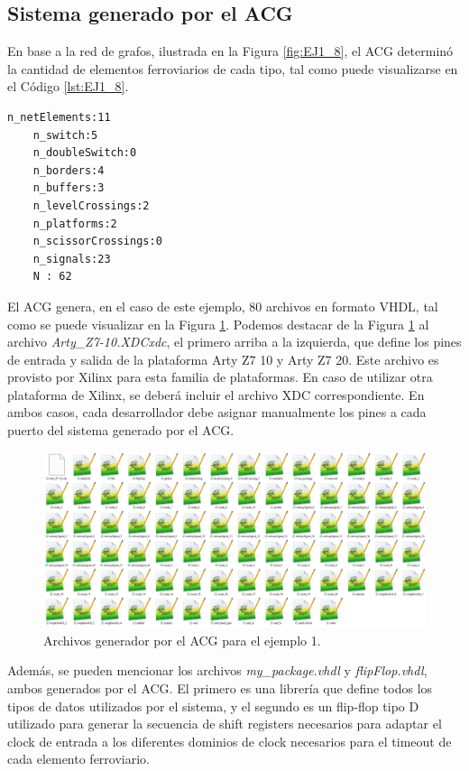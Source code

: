 \subsection{Sistema generado por el ACG}
	\label{sec:EJEMPLO1_ACG}
	
	En base a la red de grafos, ilustrada en la Figura \ref{fig:EJ1_8}, el ACG determinó la cantidad de elementos ferroviarios de cada tipo, tal como puede visualizarse en el Código \ref{lst:EJ1_8}.
	
	\begin{lstlisting}[language = {}, caption = Cantidad de elementos a implementar por el ACG, label = {lst:EJ1_8}]
	n_netElements:11
	n_switch:5
	n_doubleSwitch:0
	n_borders:4
	n_buffers:3
	n_levelCrossings:2
	n_platforms:2
	n_scissorCrossings:0
	n_signals:23
	N : 62
	\end{lstlisting}
	
	El ACG genera, en el caso de este ejemplo, 80 archivos en formato VHDL, tal como se puede visualizar en la Figura \ref{fig:EJ1_ACG_1}. Podemos destacar de la Figura \ref{fig:EJ1_ACG_1} al archivo \textit{Arty\_Z7-10.XDCxdc}, el primero arriba a la izquierda, que define los pines de entrada y salida de la plataforma Arty Z7 10 y Arty Z7 20. Este archivo es provisto por Xilinx para esta familia de plataformas. En caso de utilizar otra plataforma de Xilinx, se deberá incluir el archivo XDC correspondiente. En ambos casos, cada desarrollador debe asignar manualmente los pines a cada puerto del sistema generado por el ACG.
	
	\begin{figure}[H]
		\centering
		\includegraphics[origin = c, width=1\textwidth]{resultados-obtenidos/ejemplo1/images/ACG_files}
		\centering\caption{Archivos generador por el ACG para el ejemplo 1.}
		\label{fig:EJ1_ACG_1}
	\end{figure}
	
	Además, se pueden mencionar los archivos \textit{my\_package.vhdl} y \textit{flipFlop.vhdl}, ambos generados por el ACG. El primero es una librería que define todos los tipos de datos utilizados por el sistema, y el segundo es un flip-flop tipo D utilizado para generar la secuencia de shift registers necesarios para adaptar el clock de entrada a los diferentes dominios de clock necesarios para el timeout de cada elemento ferroviario.
	
